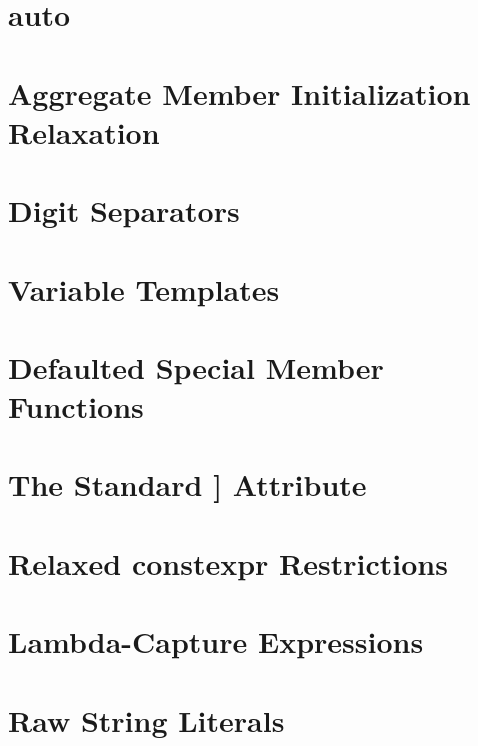 \newpage
\section[{\ttfamily auto}]{{\SecCode auto}}\label{auto}




\newpage
\section[Aggregate Member Initialization Relaxation]{Aggregate Member Initialization Relaxation}\label{aggregate-member-initialization-relaxation}


\newpage
\section[Digit Separators]{Digit Separators}
\label{digitseparator} %
\label{digit-separators} %


\newpage
\section[Variable Templates]{Variable Templates}
\label{variable-templates}


\newpage
\section[Defaulted Special Member Functions]{Defaulted Special Member Functions}\label{Defaulted-Special-Member-Functions}\label{defaulted-special-member-functions}


\newpage
\section[{\tt [[deprecated]]}]{The Standard {\SecCode [[deprecated]]} Attribute\sectionmark{{\RHCode [[deprecated]]}}}\label{deprecated}\label{the-standard-[[deprecated]]-attribute}\sectionmark{{\RHCode [[deprecated]]}}


\newpage
\section[Relaxed {\ttfamily constexpr} Restrictions]{Relaxed {\SecCode constexpr} Restrictions}\label{relaxed-constexpr-restrictions}


\newpage
\section[Lambda-Capture Expressions]{Lambda-Capture Expressions}\label{lambda-capture-expressions}


\newpage
\section[Raw String Literals]{Raw String Literals}\label{raw-string-literals}





